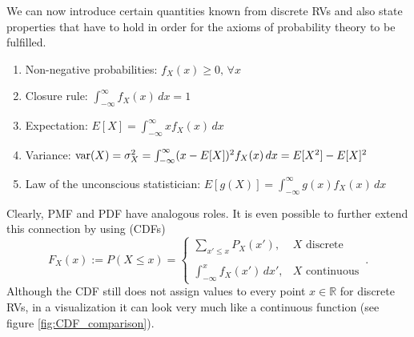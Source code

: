 We can now introduce certain quantities known from discrete RVs and also state properties that have to hold in order for the axioms of probability theory to be fulfilled.
\begin{prop}

\begin{enumerate}
\item Non-negative probabilities: $f_X(x) \geq 0, \, \forall x$

\item Closure rule: $\int_{- \infty}^\infty f_X(x) \, dx = 1$

\item Expectation: $E[X] = \int_{- \infty}^\infty x f_X(x) \, dx$

\item Variance: $\operatorname{var}(X) = \sigma_X^2 = \int_{- \infty}^\infty (x - E[X])^2 f_X(x) \, dx = E[X^2] - E[X]^2$

\item Law of the unconscious statistician: $E[g(X)] = \int_{-\infty}^\infty g(x) f_X(x) \, dx$
\end{enumerate}
\end{prop}
Clearly, PMF and PDF have analogous roles. It is even possible to further extend this connection by using  (CDFs)
\begin{equation}
F_X(x) := P(X \leq x) = \begin{cases} \displaystyle \sum_{x' \leq x} P_X(x'), & X \text{ discrete} \\\\ \displaystyle \int_{- \infty}^x f_X(x') \, dx', & X \text{ continuous} \end{cases} \, .
\end{equation}
Although the CDF still does not assign values to every point $x \in \mathbb{R}$ for discrete RVs, in a visualization it can look very much like a continuous function (see figure \ref{fig:CDF_comparison}).



